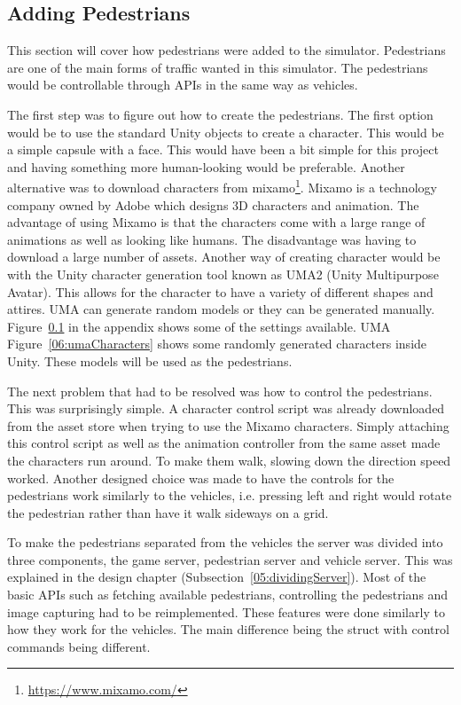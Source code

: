 \subsection{Adding Pedestrians}
This section will cover how pedestrians were added to the simulator. Pedestrians are one of the main forms of traffic wanted in this simulator. The pedestrians would be controllable through APIs in the same way as vehicles. 

The first step was to figure out how to create the pedestrians. The first option would be to use the standard Unity objects to create a character. This would be a simple capsule with a face. This would have been a bit simple for this project and having something more human-looking would be preferable. Another alternative was to download characters from mixamo\footnote{\url{ https://www.mixamo.com/}}. Mixamo is a technology company owned by Adobe which designs 3D characters and animation. The advantage of using Mixamo is that the characters come with a large range of animations as well as looking like humans. The disadvantage was having to download a large number of assets. Another way of creating character would be with the Unity character generation tool known as UMA2 (Unity Multipurpose Avatar). This allows for the character to have a variety of different shapes and attires. UMA can generate random models or they can be generated manually. Figure~\ref{} in the appendix shows some of the settings available. UMA  Figure~\ref{06:umaCharacters} shows some randomly generated characters inside Unity. These models will be used as the pedestrians. 

The next problem that had to be resolved was how to control the pedestrians. This was surprisingly simple. A character control script was already downloaded from the asset store when trying to use the Mixamo characters. Simply attaching this control script as well as the animation controller from the same asset made the characters run around. To make them walk, slowing down the direction speed worked. Another designed choice was made to have the controls for the pedestrians work similarly to the vehicles, i.e. pressing left and right would rotate the pedestrian rather than have it walk sideways on a grid. 

To make the pedestrians separated from the vehicles the server was divided into three components, the game server, pedestrian server and vehicle server. This was explained in the design chapter (Subsection~\ref{05:dividingServer}). Most of the basic APIs such as fetching available pedestrians, controlling the pedestrians and image capturing had to be reimplemented. These features were done similarly to how they work for the vehicles. The main difference being the struct with control commands being different. 

